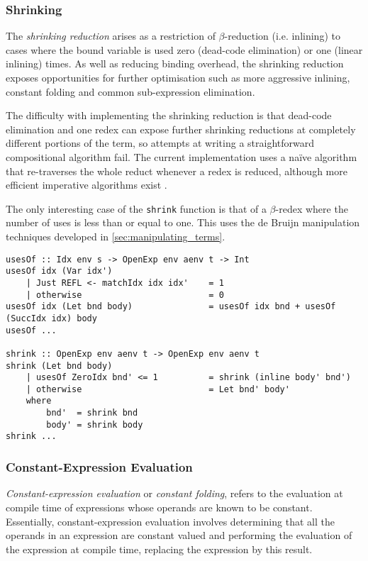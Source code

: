 \subsubsection{Shrinking}

The \emph{shrinking reduction} \cite{Appel:1997gs} arises as a restriction of
$\beta$-reduction (i.e. inlining) to cases where the bound variable is used zero
(dead-code elimination) or one (linear inlining) times. As well as reducing
binding overhead, the shrinking reduction exposes opportunities for further
optimisation such as more aggressive inlining, constant folding and common
sub-expression elimination.

The difficulty with implementing the shrinking reduction is that dead-code
elimination and one redex can expose further shrinking reductions at completely
different portions of the term, so attempts at writing a straightforward
compositional algorithm fail. The current implementation uses a na\"ive
algorithm that re-traverses the whole reduct whenever a redex is reduced,
although more efficient imperative algorithms exist
\cite{Appel:1997gs,Benton:2004ua,Kennedy:2007cb}.

The only interesting case of the \texttt{shrink} function is that of a
$\beta$-redex where the number of uses is less than or equal to one. This uses
the de Bruijn manipulation techniques developed in
\autoref{sec:manipulating_terms}.
%
\begin{lstlisting}[style=Haskell]
usesOf :: Idx env s -> OpenExp env aenv t -> Int
usesOf idx (Var idx')
    | Just REFL <- matchIdx idx idx'    = 1
    | otherwise                         = 0
usesOf idx (Let bnd body)               = usesOf idx bnd + usesOf (SuccIdx idx) body
usesOf ...

shrink :: OpenExp env aenv t -> OpenExp env aenv t
shrink (Let bnd body)
    | usesOf ZeroIdx bnd' <= 1          = shrink (inline body' bnd')
    | otherwise                         = Let bnd' body'
    where
        bnd'  = shrink bnd
        body' = shrink body
shrink ...
\end{lstlisting}


\subsubsection{Constant-Expression Evaluation}

\emph{Constant-expression evaluation} or \emph{constant folding}, refers to the
evaluation at compile time of expressions whose operands are known to be
constant. Essentially, constant-expression evaluation involves determining that
all the operands in an expression are constant valued and performing the
evaluation of the expression at compile time, replacing the expression by this
result.

